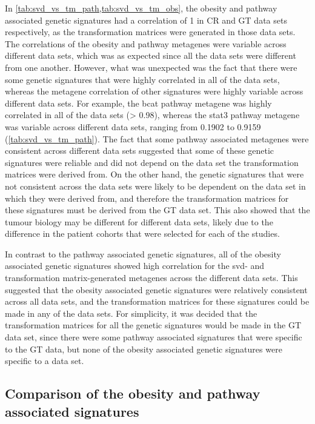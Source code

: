 In \cref{tab:svd_vs_tm_path,tab:svd_vs_tm_obs}, the obesity and pathway associated genetic signatures had a correlation of 1 in CR and GT data sets respectively, as the transformation matrices were generated in those data sets.
The correlations of the obesity and pathway metagenes were variable across different data sets, which was as expected since all the data sets were different from one another.
However, what was unexpected was the fact that there were some genetic signatures that were highly correlated in all of the data sets, whereas the metagene correlation of other signatures were highly variable across different data sets.
For example, the \gls{bcat} pathway metagene was highly correlated in all of the data sets (\textgreater{} 0.98), whereas the \gls{stat3} pathway metagene was variable across different data sets, ranging from 0.1902 to 0.9159 (\cref{tab:svd_vs_tm_path}).
The fact that some pathway associated metagenes were consistent across different data sets suggested that some of these genetic signatures were reliable and did not depend on the data set the transformation matrices were derived from.
On the other hand, the genetic signatures that were not consistent across the data sets were likely to be dependent on the data set in which they were derived from, and therefore the transformation matrices for these signatures must be derived from the GT data set.
This also showed that the tumour biology may be different for different data sets, likely due to the difference in the patient cohorts that were selected for each of the studies.

In contrast to the pathway associated genetic signatures, all of the obesity associated genetic signatures showed high correlation for the \gls{svd}- and transformation matrix-generated metagenes across the different data sets.
This suggested that the obesity associated genetic signatures were relatively consistent across all data sets, and the transformation matrices for these signatures could be made in any of the data sets.
For simplicity, it was decided that the transformation matrices for all the genetic  signatures would be made in the GT data set, since there were some pathway associated signatures that were specific to the GT data, but none of the obesity associated genetic signatures were specific to a data set.

\subsection{Comparison of the obesity and pathway associated signatures}
\label{sub:comparison_of_the_obesity_and_pathway_associated_signatures}

